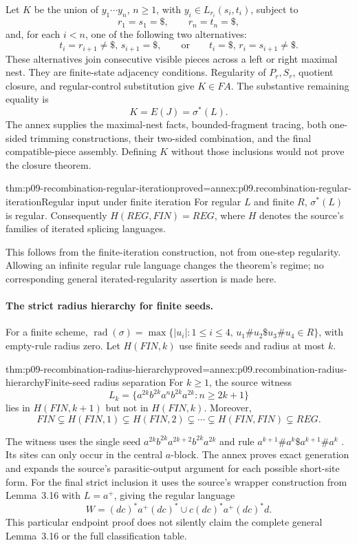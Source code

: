 Let \(K\) be the union of \(y_1\cdots y_n\), \(n\geq1\), with
\(y_i\in L_{r_i}(s_i,t_i)\), subject to
\[
 r_1=s_1=\$,\qquad r_n=t_n=\$,
\]
and, for each \(i<n\), one of the following two alternatives:
\[
 t_i=r_{i+1}\ne\$,\,s_{i+1}=\$,
 \qquad\text{or}\qquad
 t_i=\$,\,r_i=s_{i+1}\ne\$.
\]
These alternatives join consecutive visible pieces across a left or right
maximal nest. They are finite-state adjacency conditions.
Regularity of \(P_r,S_r\), quotient closure, and regular-control substitution
give \(K\in FA\).
The substantive remaining equality is
\[
 K=E(J)=\sigma^*(L).
\]
The annex supplies the maximal-nest facts, bounded-fragment tracing,
both one-sided trimming constructions, their two-sided combination,
and the final compatible-piece assembly. Defining \(K\) without those
inclusions would not prove the closure theorem.

\begin{hbcorollary}{thm:p09-recombination-regular-iteration}{proved=annex:p09.recombination-regular-iteration}{Regular input under finite iteration}
For regular \(L\) and finite \(R\), \(\sigma^*(L)\) is regular.
Consequently \(H(REG,FIN)=REG\), where \(H\) denotes the source's
families of iterated splicing languages.
\end{hbcorollary}

This follows from the finite-iteration construction, not from one-step
regularity. Allowing an infinite regular rule language changes the theorem's
regime; no corresponding general iterated-regularity assertion is made here.

\paragraph{The strict radius hierarchy for finite seeds.}
For a finite scheme,
\(\operatorname{rad}(\sigma)=\max\{|u_i|:1\leq i\leq4,\,
u_1\#u_2\$u_3\#u_4\in R\}\), with empty-rule radius zero.
Let \(H(FIN,k)\) use finite seeds and radius at most \(k\).

\begin{hbtheorem}{thm:p09-recombination-radius-hierarchy}{proved=annex:p09.recombination-radius-hierarchy}{Finite-seed radius separation}
For \(k\geq1\), the source witness
\[
 L_k=\{a^{2k}b^{2k}a^nb^{2k}a^{2k}:n\geq2k+1\}
\]
lies in \(H(FIN,k+1)\) but not in \(H(FIN,k)\). Moreover,
\[
 FIN\subsetneq H(FIN,1)\subsetneq H(FIN,2)\subsetneq\cdots
 \subsetneq H(FIN,FIN)\subsetneq REG.
\]
\end{hbtheorem}

The witness uses the single seed
\(a^{2k}b^{2k}a^{2k+2}b^{2k}a^{2k}\) and rule
\(a^{k+1}\#a^k\$a^{k+1}\#a^k\)
\cite[Theorem~3.4, p.~317]{HeadPaunPixton1997RecombinationIntake}.
Its sites can only occur in the central \(a\)-block. The annex proves exact
generation and expands the source's parasitic-output argument for each
possible short-site form. For the final strict inclusion it uses the
source's wrapper construction from Lemma~3.16 with \(L=a^+\), giving
the regular language
\[
 W=(dc)^*a^+(dc)^*\cup c(dc)^*a^+(dc)^*d.
\]
This particular endpoint proof does not silently claim the complete general
Lemma~3.16 or the full classification table.

